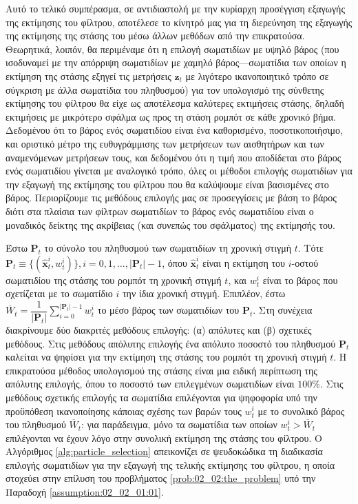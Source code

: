 Αυτό το τελικό συμπέρασμα, σε αντιδιαστολή με την κυρίαρχη προσέγγιση εξαγωγής
της εκτίμησης του φίλτρου, αποτέλεσε το κίνητρό μας για τη διερεύνηση της
εξαγωγής της εκτίμησης της στάσης του μέσω άλλων μεθόδων από την επικρατούσα.
Θεωρητικά, λοιπόν, θα περιμέναμε ότι η επιλογή σωματιδίων με υψηλό βάρος (που
ισοδυναμεί με την απόρριψη σωματιδίων με χαμηλό βάρος---σωματίδια των οποίων η
εκτίμηση της στάσης εξηγεί τις μετρήσεις $\bm{z}_t$ με λιγότερο ικανοποιητικό
τρόπο σε σύγκριση με άλλα σωματίδια του πληθυσμού) για τον υπολογισμό της
σύνθετης εκτίμησης του φίλτρου θα είχε ως αποτέλεσμα καλύτερες εκτιμήσεις
στάσης, δηλαδή εκτιμήσεις με μικρότερο σφάλμα ως προς τη στάση ρομπότ σε κάθε
χρονικό βήμα. Δεδομένου ότι το βάρος ενός σωματιδίου είναι ένα καθορισμένο,
ποσοτικοποιήσιμο, και οριστικό μέτρο της ευθυγράμμισης των μετρήσεων των
αισθητήρων και των αναμενόμενων μετρήσεων τους, και δεδομένου ότι η τιμή που
αποδίδεται στο βάρος ενός σωματιδίου γίνεται με αναλογικό τρόπο, όλες οι
μέθοδοι επιλογής σωματιδίων για την εξαγωγή της εκτίμησης του φίλτρου που θα
καλύψουμε είναι βασισμένες στο βάρος. Περιορίζουμε τις μεθόδους επιλογής μας σε
προσεγγίσεις με βάση το βάρος διότι στα πλαίσια των φίλτρων σωματιδίων το βάρος
ενός σωματιδίου είναι ο μοναδικός δείκτης της ακρίβειας (και συνεπώς του
σφάλματος) της εκτίμησής του.

Έστω $\bm{P}_t$ το σύνολο του πληθυσμού των σωματιδίων τη χρονική στιγμή $t$.
Τότε $\bm{P}_t \equiv \{(\hat{\bm{x}}_t^i, w_t^i)\}, i =
0,1,\dots,|\bm{P}_t|-1$, όπου $\hat{\bm{x}}_t^i$ είναι η εκτίμηση του $i$-οστού
σωματιδίου της στάσης του ρομπότ τη χρονική στιγμή $t$, και $w_t^i$ είναι το
βάρος που σχετίζεται με το σωματίδιο $i$ την ίδια χρονική στιγμή.  Επιπλέον,
έστω $\overline{W}_t = \dfrac{1}{|\bm{P}_t|}\sum\limits_{i=0}^{|\bm{P}_t|-1}
w_t^i$ το μέσο βάρος των σωματιδίων του $\bm{P}_t$. Στη συνέχεια διακρίνουμε
δύο διακριτές μεθόδους επιλογής: (α) απόλυτες και (β) σχετικές μεθόδους.
Στις μεθόδους απόλυτης επιλογής ένα απόλυτο ποσοστό του πληθυσμού
$\bm{P}_t$ καλείται να ψηφίσει για την εκτίμηση της στάσης του ρομπότ τη
χρονική στιγμή $t$. Η επικρατούσα μέθοδος υπολογισμού της στάσης είναι μια
ειδική περίπτωση της απόλυτης επιλογής, όπου το ποσοστό των επιλεγμένων
σωματιδίων είναι $100\%$.  Στις μεθόδους σχετικής επιλογής τα σωματίδια
επιλέγονται για ψηφοφορία υπό την προϋπόθεση ικανοποίησης κάποιας σχέσης των
βαρών τους $w_t^i$ με το συνολικό βάρος του πληθυσμού $\overline{W}_t$: για
παράδειγμα, μόνο τα σωματίδια των οποίων $w_t^i > \overline{W}_t$ επιλέγονται
να έχουν λόγο στην συνολική εκτίμηση της στάσης του φίλτρου. Ο Αλγόριθμος
\ref{alg:particle_selection} απεικονίζει σε ψευδοκώδικα τη διαδικασία επιλογής
σωματιδίων για την εξαγωγή της τελικής εκτίμησης του φίλτρου, η οποία στοχεύει
στην επίλυση του προβλήματος \ref{prob:02_02:the_problem} υπό την Παραδοχή
\ref{assumption:02_02_01:01}.

